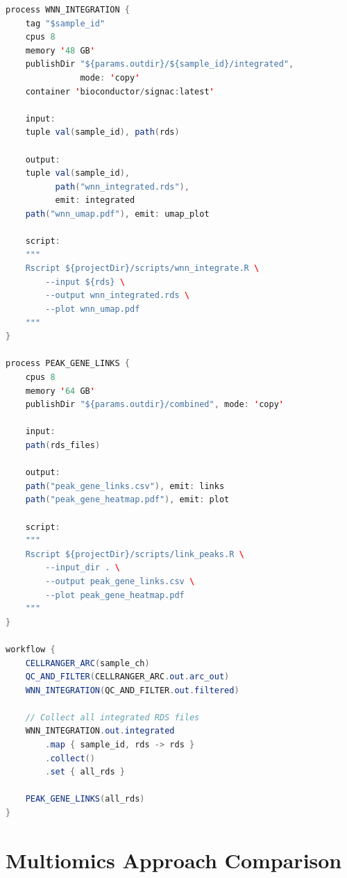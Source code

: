 \begin{lstlisting}[language=Java, caption={Nextflow workflow for 10x Multiome processing.}, label={lst:multiomics:nextflow}]
process WNN_INTEGRATION {
    tag "$sample_id"
    cpus 8
    memory '48 GB'
    publishDir "${params.outdir}/${sample_id}/integrated",
               mode: 'copy'
    container 'bioconductor/signac:latest'

    input:
    tuple val(sample_id), path(rds)

    output:
    tuple val(sample_id),
          path("wnn_integrated.rds"),
          emit: integrated
    path("wnn_umap.pdf"), emit: umap_plot

    script:
    """
    Rscript ${projectDir}/scripts/wnn_integrate.R \
        --input ${rds} \
        --output wnn_integrated.rds \
        --plot wnn_umap.pdf
    """
}

process PEAK_GENE_LINKS {
    cpus 8
    memory '64 GB'
    publishDir "${params.outdir}/combined", mode: 'copy'

    input:
    path(rds_files)

    output:
    path("peak_gene_links.csv"), emit: links
    path("peak_gene_heatmap.pdf"), emit: plot

    script:
    """
    Rscript ${projectDir}/scripts/link_peaks.R \
        --input_dir . \
        --output peak_gene_links.csv \
        --plot peak_gene_heatmap.pdf
    """
}

workflow {
    CELLRANGER_ARC(sample_ch)
    QC_AND_FILTER(CELLRANGER_ARC.out.arc_out)
    WNN_INTEGRATION(QC_AND_FILTER.out.filtered)

    // Collect all integrated RDS files
    WNN_INTEGRATION.out.integrated
        .map { sample_id, rds -> rds }
        .collect()
        .set { all_rds }

    PEAK_GENE_LINKS(all_rds)
}
\end{lstlisting}


\section{Multiomics Approach Comparison}
\label{sec:multiomics:comparison}

